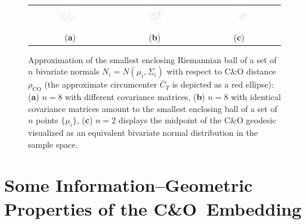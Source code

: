 \documentclass[entropy,article,accept,oneauthor,pdftex,entropy]{Definitions/mdpi}
\def\CO{\mathrm{CO}}
\begin{document}
\begin{figure}[H]

\begin{tabular}{ccc}
\includegraphics[width=0.25\textwidth]{MiniMaxCenterMVN-N8.pdf} &
\includegraphics[width=0.25\textwidth]{MiniMaxCenterMVN-SameCovarN8.pdf} &
\includegraphics[width=0.25\textwidth]{MiniMaxCenterMVN-N2.pdf}\\
(\textbf{a}) & (\textbf{b}) & (\textbf{c})
\end{tabular}


\caption{Approximation of the smallest enclosing Riemannian ball of a set of $n$ bivariate normals $N_i=N(\mu_i,\Sigma_i)$ with respect to C\&O distance $\rho_\CO$ (the approximate circumcenter $\bar C_T$ is depicted as a red ellipse):
(\textbf{a}) $n=8$ with different covariance matrices,
(\textbf{b}) $n=8$ with identical covariance matrices amount to the smallest enclosing ball of a set of $n$ points $\{\mu_i\}$,
(\textbf{c}) $n=2$ displays the midpoint of the C\&O geodesic visualized as an equivalent bivariate normal distribution in the sample space.
 \label{fig:MiniBallCO}}
\end{figure}
\unskip

\section{Some Information–Geometric Properties of the C\&O~Embedding}\label{sec:prop}  %
\end{document}
